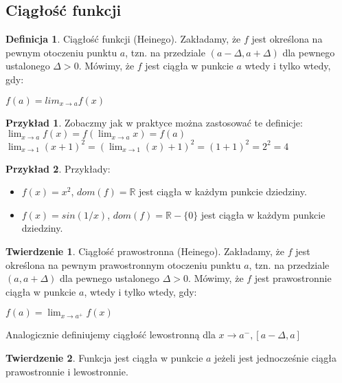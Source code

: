 \documentclass{article}
\theoremstyle{definition}
\newtheorem{de}{Definicja}[subsection]
\theoremstyle{definition}
\newtheorem{tw}{Twierdzenie}[subsection]
\theoremstyle{definition}
\newtheorem{pk}{Przykład}[subsection]
\theoremstyle{definition}
\begin{document}
\subsection{Ciągłość funkcji}

\begin{de}
    Ciągłość funkcji (Heinego). Zakładamy, że $f$ jest określona na pewnym otoczeniu punktu $a$,
    tzn. na przedziale $(a-\Delta, a+\Delta)$ dla pewnego ustalonego $\Delta>0$. Mówimy, że $f$ jest ciągła w punkcie $a$ wtedy i tylko wtedy, gdy:
    \begin{center}
        $f(a)=lim_{x\rightarrow a} f(x)$
    \end{center}
\end{de}

\begin{pk}
    Zobaczmy jak w praktyce można zastosować te definicje:\\
    $\lim_{x\rightarrow a} f(x) = f(\lim_{x\rightarrow a} x) = f(a)$\\
    $\lim_{x\rightarrow 1} (x+1)^2 = (\lim_{x\rightarrow 1} (x)+1)^2 = (1+1)^2=2^2=4$
\end{pk}

\begin{pk}
    Przykłady:
    \begin{itemize}
        \item $f(x)=x^2$, $dom(f)=\mathbb{R}$ jest ciągła w każdym punkcie dziedziny.
        \item $f(x)=sin(1/x)$, $dom(f)=\mathbb{R}-\{0\}$ jest ciągła w każdym punkcie dziedziny.
    \end{itemize}
\end{pk}

\begin{tw}
    Ciągłość prawostronna (Heinego). Zakładamy, że $f$ jest określona na pewnym prawostronnym otoczeniu punktu $a$,
    tzn. na przedziale $(a,a+\Delta)$ dla pewnego ustalonego $\Delta>0$. Mówimy, że $f$ jest prawostronnie ciągła w punkcie $a$,
    wtedy i tylko wtedy, gdy:
    \begin{center}
        $f(a) = \lim_{x\rightarrow a^{+}} f(x)$
    \end{center}
    Analogicznie definiujemy ciągłość lewostronną dla $x\rightarrow a^{-}, [a-\Delta,a]$
\end{tw}

\begin{tw}
    Funkcja jest ciągła w punkcie $a$ jeżeli jest jednocześnie ciągła prawostronnie i lewostronnie.
\end{tw}
\end{document}
